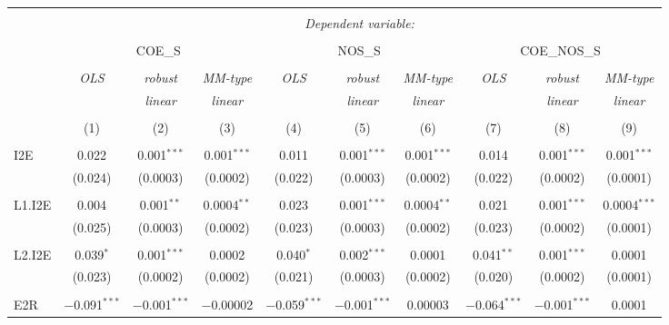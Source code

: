 
\begin{table}[!htbp] \centering 
  \caption{} 
  \label{} 
\begin{tabular}{@{\extracolsep{5pt}}lccccccccc} 
\\[-1.8ex]\hline 
\hline \\[-1.8ex] 
 & \multicolumn{9}{c}{\textit{Dependent variable:}} \\ 
\cline{2-10} 
\\[-1.8ex] & \multicolumn{3}{c}{COE\_S} & \multicolumn{3}{c}{NOS\_S} & \multicolumn{3}{c}{COE\_NOS\_S} \\ 
\\[-1.8ex] & \textit{OLS} & \textit{robust} & \textit{MM-type} & \textit{OLS} & \textit{robust} & \textit{MM-type} & \textit{OLS} & \textit{robust} & \textit{MM-type} \\ 
 & \textit{} & \textit{linear} & \textit{linear} & \textit{} & \textit{linear} & \textit{linear} & \textit{} & \textit{linear} & \textit{linear} \\ 
\\[-1.8ex] & (1) & (2) & (3) & (4) & (5) & (6) & (7) & (8) & (9)\\ 
\hline \\[-1.8ex] 
 I2E & 0.022 & 0.001$^{***}$ & 0.001$^{***}$ & 0.011 & 0.001$^{***}$ & 0.001$^{***}$ & 0.014 & 0.001$^{***}$ & 0.001$^{***}$ \\ 
  & (0.024) & (0.0003) & (0.0002) & (0.022) & (0.0003) & (0.0002) & (0.022) & (0.0002) & (0.0001) \\ 
  & & & & & & & & & \\ 
 L1.I2E & 0.004 & 0.001$^{**}$ & 0.0004$^{**}$ & 0.023 & 0.001$^{***}$ & 0.0004$^{**}$ & 0.021 & 0.001$^{***}$ & 0.0004$^{***}$ \\ 
  & (0.025) & (0.0003) & (0.0002) & (0.023) & (0.0003) & (0.0002) & (0.023) & (0.0002) & (0.0001) \\ 
  & & & & & & & & & \\ 
 L2.I2E & 0.039$^{*}$ & 0.001$^{***}$ & 0.0002 & 0.040$^{*}$ & 0.002$^{***}$ & 0.0001 & 0.041$^{**}$ & 0.001$^{***}$ & 0.0001 \\ 
  & (0.023) & (0.0002) & (0.0002) & (0.021) & (0.0003) & (0.0002) & (0.020) & (0.0002) & (0.0001) \\ 
  & & & & & & & & & \\ 
 E2R & $-$0.091$^{***}$ & $-$0.001$^{***}$ & $-$0.00002 & $-$0.059$^{***}$ & $-$0.001$^{***}$ & 0.00003 & $-$0.064$^{***}$ & $-$0.001$^{***}$ & 0.0001 \\ 

\end{tabular}
\end{table}
